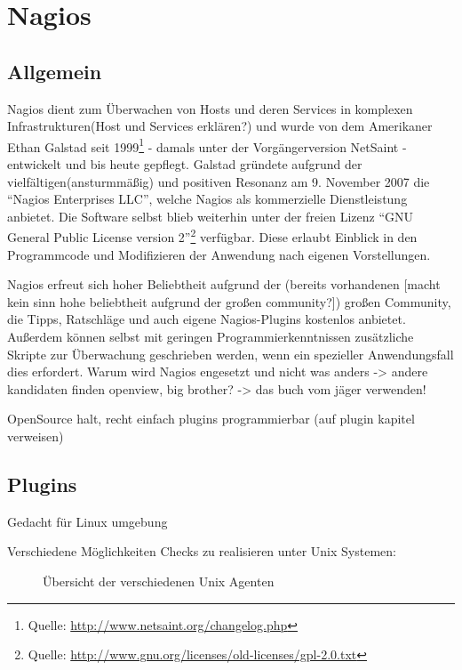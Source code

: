 \section{Nagios}

\subsection{Allgemein}
Nagios dient zum Überwachen von Hosts und deren Services in komplexen Infrastrukturen(Host und Services erklären?) und wurde von dem Amerikaner Ethan Galstad seit 1999\footnote{Quelle: \url{http://www.netsaint.org/changelog.php}} - damals unter der Vorgängerversion NetSaint - entwickelt und bis heute gepflegt.
Galstad gründete aufgrund der vielfältigen(ansturmmäßig) und positiven Resonanz am 9. November 2007 die "`Nagios Enterprises LLC"', welche Nagios als kommerzielle Dienstleistung anbietet.
Die Software selbst blieb weiterhin unter der freien Lizenz "`GNU General Public License version 2"'\footnote{Quelle: \url{http://www.gnu.org/licenses/old-licenses/gpl-2.0.txt}} verfügbar.
Diese erlaubt Einblick in den Programmcode und Modifizieren der Anwendung nach eigenen Vorstellungen.

Nagios erfreut sich hoher Beliebtheit aufgrund der (bereits vorhandenen [macht kein sinn hohe beliebtheit aufgrund der großen community?]) großen Community, die Tipps, Ratschläge und auch eigene Nagios-Plugins kostenlos anbietet.
Außerdem können selbst mit geringen Programmierkenntnissen zusätzliche Skripte zur Überwachung geschrieben werden, wenn ein spezieller Anwendungsfall dies erfordert.
Warum wird Nagios engesetzt und nicht was anders -> andere kandidaten finden openview, big brother? -> das buch vom jäger verwenden!

OpenSource halt, recht einfach plugins programmierbar (auf plugin kapitel verweisen)





\subsection{Plugins}
Gedacht für Linux umgebung

Verschiedene Möglichkeiten Checks zu realisieren unter Unix Systemen:

\begin{figure}[ht]
	\centering
		\caption{Übersicht der verschiedenen Unix Agenten\protect\footnotemark}
		\label{nix-agents}
\end{figure}

